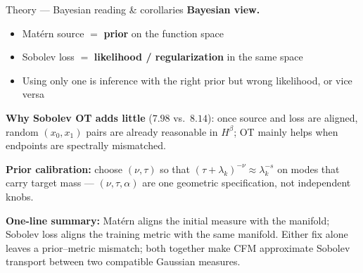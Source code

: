 \documentclass[aspectratio=169,11pt]{beamer}
\begin{document}
\begin{frame}{Theory --- Bayesian reading \& corollaries}
  \small
  \textbf{Bayesian view.}
  \begin{itemize}\setlength{\itemsep}{0.12em}
    \item Mat\'ern source $=$ \textbf{prior} on the function space
    \item Sobolev loss $=$ \textbf{likelihood / regularization} in the same space
    \item Using only one is inference with the right prior but wrong likelihood, or vice versa
  \end{itemize}

  \vspace{0.35em}
  \textbf{Why Sobolev OT adds little} ($7.98$ vs.\ $8.14$): once source and loss are aligned, random $(x_0, x_1)$ pairs are already reasonable in $H^\beta$; OT mainly helps when endpoints are spectrally mismatched.

  \vspace{0.35em}
  \textbf{Prior calibration:} choose $(\nu, \tau)$ so that $(\tau + \lambda_k)^{-\nu} \approx \lambda_k^{-s}$ on modes that carry target mass --- $(\nu, \tau, \alpha)$ are one geometric specification, not independent knobs.

  \vspace{0.35em}
  \textbf{One-line summary:} Mat\'ern aligns the initial measure with the manifold; Sobolev loss aligns the training metric with the same manifold. Either fix alone leaves a prior--metric mismatch; both together make CFM approximate Sobolev transport between two compatible Gaussian measures.
\end{frame}
\end{document}
